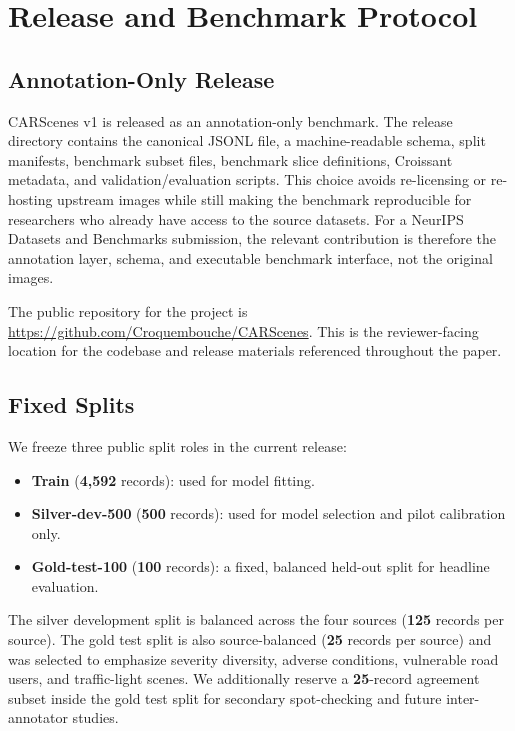 \section{Release and Benchmark Protocol}
\label{sec:release}

\subsection{Annotation-Only Release}
CARScenes v1 is released as an annotation-only benchmark. The release directory contains the canonical JSONL file, a machine-readable schema, split manifests, benchmark subset files, benchmark slice definitions, Croissant metadata, and validation/evaluation scripts. This choice avoids re-licensing or re-hosting upstream images while still making the benchmark reproducible for researchers who already have access to the source datasets. For a NeurIPS Datasets and Benchmarks submission, the relevant contribution is therefore the annotation layer, schema, and executable benchmark interface, not the original images.

The public repository for the project is \url{https://github.com/Croquembouche/CARScenes}. This is the reviewer-facing location for the codebase and release materials referenced throughout the paper.

\subsection{Fixed Splits}
We freeze three public split roles in the current release:
\begin{itemize}
  \item \textbf{Train} (\textbf{4,592} records): used for model fitting.
  \item \textbf{Silver-dev-500} (\textbf{500} records): used for model selection and pilot calibration only.
  \item \textbf{Gold-test-100} (\textbf{100} records): a fixed, balanced held-out split for headline evaluation.
\end{itemize}
The silver development split is balanced across the four sources (\textbf{125} records per source). The gold test split is also source-balanced (\textbf{25} records per source) and was selected to emphasize severity diversity, adverse conditions, vulnerable road users, and traffic-light scenes. We additionally reserve a \textbf{25}-record agreement subset inside the gold test split for secondary spot-checking and future inter-annotator studies.

